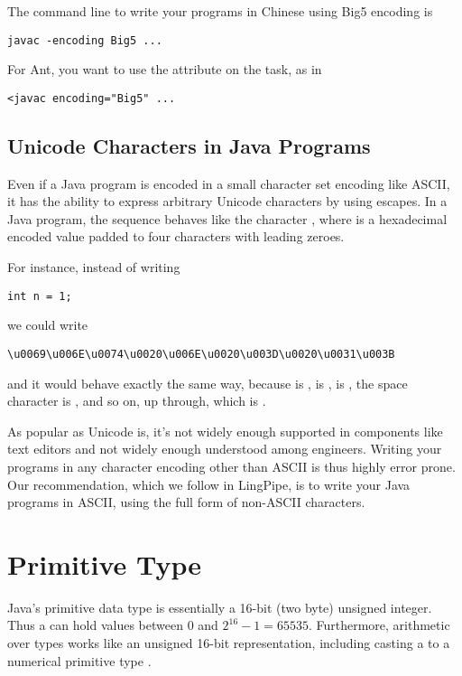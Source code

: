 The command line to write your programs in Chinese using Big5 encoding
is
%
\begin{verbatim}
javac -encoding Big5 ...
\end{verbatim}
%
For Ant, you want to use the  attribute on the
 task, as in
%
\begin{verbatim}
<javac encoding="Big5" ...
\end{verbatim}


\subsection{Unicode Characters in Java Programs}\label{section:char-unicode-java}

Even if a Java program is encoded in a small character set encoding
like ASCII, it has the ability to express arbitrary Unicode characters
by using escapes.  In a Java program, the sequence
  behaves like the character
, where  is a hexadecimal
encoded value padded to four characters with leading zeroes.

For instance, instead of writing

\begin{verbatim}
int n = 1;
\end{verbatim}
%
we could write
%
\begin{verbatim}
\u0069\u006E\u0074\u0020\u006E\u0020\u003D\u0020\u0031\u003B
\end{verbatim}
%
and it would behave exactly the same way, because
 is ,  is
,  is ,
the space character is , and so on, up
through\charmention{;}, which is .

As popular as Unicode is, it's not widely enough supported in
components like text editors and not widely enough understood among
engineers.  Writing your programs in any character encoding other than
ASCII is thus highly error prone.  Our recommendation, which we follow
in LingPipe, is to write your Java programs in ASCII, using the full
 form of non-ASCII characters.


\section{ Primitive Type}

Java's primitive  data type is essentially a 16-bit (two
byte) unsigned integer. Thus a  can hold values between 0
and $2^16-1 = 65535$.  Furthermore, arithmetic over  types
works like an unsigned 16-bit representation, including casting a
 to a numerical primitive type .

